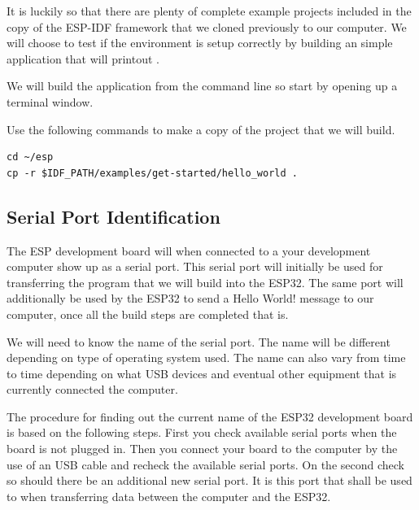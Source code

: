 \documentclass{tufte-book}
\begin{document}
It is luckily so that there are plenty of complete example projects included in the copy of the ESP-IDF framework that we cloned previously to our computer. We will choose to test if the environment is setup correctly by building an simple application that will printout .

We will build the application from the command line so start by opening up a terminal window.


Use the following commands to make a copy of the project that we will build.

\begin{lstlisting}
cd ~/esp
cp -r $IDF_PATH/examples/get-started/hello_world .
\end{lstlisting}

\subsection{Serial Port Identification} \label{sec:serial}


The ESP development board will when connected to a your development computer show up as a serial port. This serial port will initially be used for transferring the program that we will build into the ESP32. The same port will additionally be used by the ESP32 to send a Hello World! message to our computer, once all the build steps are completed that is.

We will need to know the name of the serial port. The name will be different depending on type of operating system used. The name can also vary from time to time depending on what USB devices and eventual other equipment that is currently connected the computer.

The procedure for finding out the current name of the ESP32 development board is based on the following steps. First you check available serial ports when the board is not plugged in. Then you connect your board to the computer by the use of an USB cable and recheck the available serial ports. On the second check so should there be an additional new serial port. It is this port that shall be used to when transferring data between the computer and the ESP32.
\end{document}
